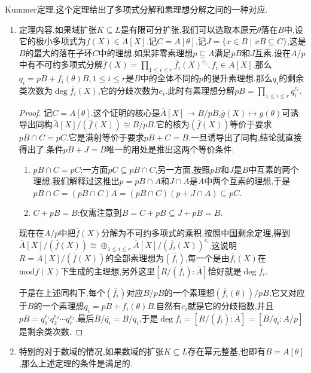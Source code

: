 Kummer定理.这个定理给出了多项式分解和素理想分解之间的一种对应.
\begin{enumerate}
	\item 定理内容.如果域扩张$K\subseteq L$是有限可分扩张,我们可以选取本原元$\theta$落在$B$中,设它的极小多项式为$f(X)\in A[X]$.记$C=A[\theta]$,记$J=\{x\in B\mid xB\subseteq C\}$,这是$B$的最大的落在子环$C$中的理想.如果非零素理想$p\subseteq A$满足$pB$和$J$互素,设在$A/p$中有不可约多项式分解$\overline{f}(X)=\prod_{1\le i\le r}\overline{f_i}(X)^{e_1},f_i\in A[X]$.那么$q_i=pB+f_i(\theta)B,1\le i\le r$是$B$中的全体不同的$p$的提升素理想.那么$q_i$的剩余类次数为$\deg\overline{f_i}(X)$,它的分歧次数为$e_i$.此时有素理想分解$pB=\prod_{1\le i\le r}q_i^{e_i}$.
	\begin{proof}
		
		记$C=A[\theta]$.这个证明的核心是$\overline{A}[X]\to B/pB$,$\overline{g}(X)\mapsto g(\theta)$可诱导出同构$\overline{A}[X]/(\overline{f}(X))\cong B/pB$.它的核为$(\overline{f}(X))$等价于要求$pB\cap C=pC$.它是满射等价于要求$pB+C=B$.一旦诱导出了同构,结论就直接得出了.条件$pB+J=B$唯一的用处是推出这两个等价条件:
		\begin{enumerate}
			\item $pB\cap C=pC$:一方面$pC\subseteq pB\cap C$,另一方面,按照$pB$和$J$是$B$中互素的两个理想,我们解释过这推出$p=pB\cap A$和$J\cap A$是$A$中两个互素的理想,于是$pB\cap C=(pB\cap C)A=(pB\cap C)(p+J\cap A)\subseteq pC$.
			\item $C+pB=B$:仅需注意到$B=C+pB\subseteq J+pB=B$.
		\end{enumerate}
		
		现在在$A/p$中把$\overline{f}(X)$分解为不可约多项式的乘积,按照中国剩余定理,得到$\overline{A}[X]/(\overline{f}(X))\cong\oplus_{1\le i\le r}\overline{A}[X]/(\overline{f_i}(X))^{e_i}$.这说明$R=\overline{A}[X]/(\overline{f}(X))$的全部素理想为$(\overline{f_i})$,每一个是由$\overline{f_i}(X)$在$\mathrm{mod}\overline{f}(X)$下生成的主理想,另外这里$[R/(\overline{f_i}):\overline{A}]$恰好就是$\deg\overline{f_i}$.
		
		于是在上述同构下,每个$(\overline{f_i})$对应$B/pB$的一个素理想$(\overline{f_i}(\theta))/pB$,它又对应于$B$的一个素理想$q_i=pB+f_i(\theta)B$.自然有$e_i$就是它的分歧指数,并且$pB=q_1^{e_1}q_2^{e_2}\cdots q_r^{e_r}$.最后$\overline{B}/\overline{q_i}=B/q_i$,于是$\deg\overline{f_i}=[R/(\overline{f_i}):\overline{A}]=[B/q_i:A/p]$是剩余类次数.
	\end{proof}
    \item 特别的对于数域的情况,如果数域的扩张$K\subseteq L$存在幂元整基,也即有$B=A[\theta]$,那么上述定理的条件是满足的.
\end{enumerate}

